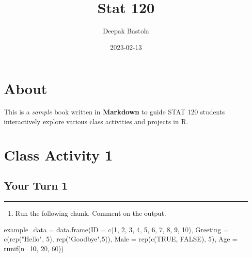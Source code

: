 \documentclass[
]{book}
\title{Stat 120}
\author{Deepak Bastola}
\date{2023-02-13}
\newenvironment{Shaded}{\begin{snugshade}}{\end{snugshade}}
\newcommand{\AttributeTok}[1]{\textcolor[rgb]{0.77,0.63,0.00}{#1}}
\newcommand{\ConstantTok}[1]{\textcolor[rgb]{0.00,0.00,0.00}{#1}}
\newcommand{\DecValTok}[1]{\textcolor[rgb]{0.00,0.00,0.81}{#1}}
\newcommand{\FunctionTok}[1]{\textcolor[rgb]{0.00,0.00,0.00}{#1}}
\newcommand{\NormalTok}[1]{#1}
\newcommand{\OtherTok}[1]{\textcolor[rgb]{0.56,0.35,0.01}{#1}}
\newcommand{\StringTok}[1]{\textcolor[rgb]{0.31,0.60,0.02}{#1}}
\providecommand{\tightlist}{%
  \setlength{\itemsep}{0pt}\setlength{\parskip}{0pt}}
\begin{document}
\maketitle

{
\setcounter{tocdepth}{1}
\tableofcontents
}
\hypertarget{about}{%
\chapter*{About}\label{about}}

This is a \emph{sample} book written in \textbf{Markdown} to guide STAT 120 students interactively explore various class activities and projects in R.

\hypertarget{class-activity-1}{%
\chapter{Class Activity 1}\label{class-activity-1}}

\hypertarget{your-turn-1}{%
\section{Your Turn 1}\label{your-turn-1}}

\begin{center}\rule{0.5\linewidth}{0.5pt}\end{center}

\begin{enumerate}
\def\labelenumi{\alph{enumi}.}
\tightlist
\item
  Run the following chunk. Comment on the output.
\end{enumerate}

\begin{Shaded}
\begin{Highlighting}[]
\NormalTok{example\_data }\OtherTok{=} \FunctionTok{data.frame}\NormalTok{(}\AttributeTok{ID =} \FunctionTok{c}\NormalTok{(}\DecValTok{1}\NormalTok{, }\DecValTok{2}\NormalTok{, }\DecValTok{3}\NormalTok{, }\DecValTok{4}\NormalTok{, }\DecValTok{5}\NormalTok{, }\DecValTok{6}\NormalTok{, }\DecValTok{7}\NormalTok{, }\DecValTok{8}\NormalTok{, }\DecValTok{9}\NormalTok{, }\DecValTok{10}\NormalTok{),}
                          \AttributeTok{Greeting =} \FunctionTok{c}\NormalTok{(}\FunctionTok{rep}\NormalTok{(}\StringTok{"Hello"}\NormalTok{, }\DecValTok{5}\NormalTok{), }\FunctionTok{rep}\NormalTok{(}\StringTok{"Goodbye"}\NormalTok{,}\DecValTok{5}\NormalTok{)),}
                          \AttributeTok{Male =} \FunctionTok{rep}\NormalTok{(}\FunctionTok{c}\NormalTok{(}\ConstantTok{TRUE}\NormalTok{, }\ConstantTok{FALSE}\NormalTok{), }\DecValTok{5}\NormalTok{),}
                          \AttributeTok{Age =} \FunctionTok{runif}\NormalTok{(}\AttributeTok{n=}\DecValTok{10}\NormalTok{, }\DecValTok{20}\NormalTok{, }\DecValTok{60}\NormalTok{))}
\end{Highlighting}
\end{Shaded}
\end{document}
